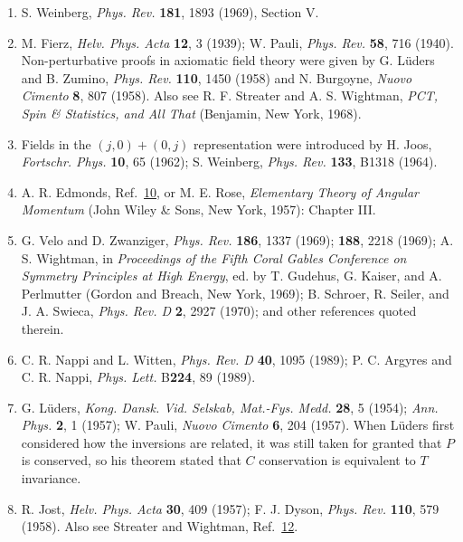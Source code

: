 \begin{enumerate}
\item\label{ref:5.11} S. Weinberg, \emph{Phys. Rev.} \textbf{181}, 1893 (1969), Section V.

\item\label{ref:5.12} M. Fierz, \emph{Helv. Phys. Acta} \textbf{12}, 3 (1939); W. Pauli,
\emph{Phys. Rev.} \textbf{58}, 716 (1940). Non-perturbative proofs in
axiomatic field theory were given by G. Lüders and B. Zumino,
\emph{Phys. Rev.} \textbf{110}, 1450 (1958) and N. Burgoyne,
\emph{Nuovo Cimento} \textbf{8}, 807 (1958). Also see R. F. Streater and
A. S. Wightman, \emph{PCT, Spin \& Statistics, and All That} (Benjamin,
New York, 1968).

\item\label{ref:5.13} Fields in the $(j,0)+(0,j)$ representation were introduced by H. Joos,
\emph{Fortschr. Phys.} \textbf{10}, 65 (1962); S. Weinberg,
\emph{Phys. Rev.} \textbf{133}, B1318 (1964).

\item\label{ref:5.14} A. R. Edmonds, Ref.~\hyperref[ref:5.10]{10}, or M. E. Rose, \emph{Elementary Theory of
Angular Momentum} (John Wiley \& Sons, New York, 1957): Chapter III.

\item\label{ref:5.15} G. Velo and D. Zwanziger, \emph{Phys. Rev.} \textbf{186}, 1337 (1969);
\textbf{188}, 2218 (1969); A. S. Wightman, in \emph{Proceedings of the Fifth
Coral Gables Conference on Symmetry Principles at High Energy}, ed. by
T. Gudehus, G. Kaiser, and A. Perlmutter (Gordon and Breach, New York,
1969); B. Schroer, R. Seiler, and J. A. Swieca, \emph{Phys. Rev. D}
\textbf{2}, 2927 (1970); and other references quoted therein.

\item\label{ref:5.16} C. R. Nappi and L. Witten, \emph{Phys. Rev. D} \textbf{40}, 1095
(1989); P. C. Argyres and C. R. Nappi, \emph{Phys. Lett.} B\textbf{224}, 89
(1989).

\item\label{ref:5.17} G. Lüders, \emph{Kong. Dansk. Vid. Selskab, Mat.-Fys. Medd.}
\textbf{28}, 5 (1954); \emph{Ann. Phys.} \textbf{2}, 1 (1957); W. Pauli,
\emph{Nuovo Cimento} \textbf{6}, 204 (1957). When Lüders first considered
how the inversions are related, it was still taken for granted that $P$ is
conserved, so his theorem stated that $C$ conservation is equivalent to $T$
invariance.

\item\label{ref:5.18} R. Jost, \emph{Helv. Phys. Acta} \textbf{30}, 409 (1957); F. J. Dyson,
\emph{Phys. Rev.} \textbf{110}, 579 (1958). Also see Streater and Wightman,
Ref.~\hyperref[ref:5.12]{12}.
\end{enumerate}

